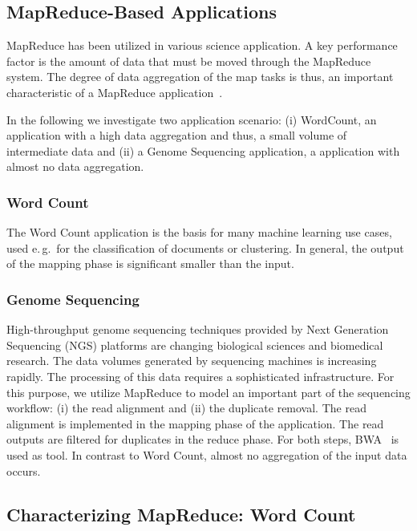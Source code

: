\documentclass{acm_proc_article-sp}
\begin{document}
\subsection{MapReduce-Based Applications}

MapReduce has been utilized in various science application. A key performance 
factor is the amount of data that must be moved through the MapReduce system. 
The degree of data aggregation of the map tasks is thus, an important 
characteristic of a MapReduce application~\cite{weissman-mr-11}.

In the following we investigate two application scenario: (i) WordCount, an
application with a high data aggregation and thus, a small volume of
intermediate data and (ii) a Genome Sequencing application, a application with
almost no data aggregation.

\subsubsection*{Word Count}

The Word Count application is the basis for many machine learning use cases, 
used e.\,g.\ for the classification of documents or clustering. In general, 
the output of the mapping phase is significant smaller than the input.


\subsubsection*{Genome Sequencing}

High-throughput genome sequencing techniques provided by Next Generation
Sequencing (NGS) platforms are changing biological sciences and biomedical
research. The data volumes generated by sequencing machines is 
increasing rapidly. The processing of this data requires a sophisticated 
infrastructure. For this purpose, we utilize MapReduce to model an important 
part of the sequencing workflow: (i) the read alignment and (ii) the 
duplicate removal. The read alignment is implemented in the mapping phase of 
the application. The read outputs are filtered for duplicates in the reduce 
phase. For both steps, BWA~\cite{Li:2010:FAL:1741823.1741825} is used as tool. 
In contrast to Word Count, almost no aggregation of the input data occurs.




\subsection{Characterizing MapReduce: Word Count}
\end{document}
